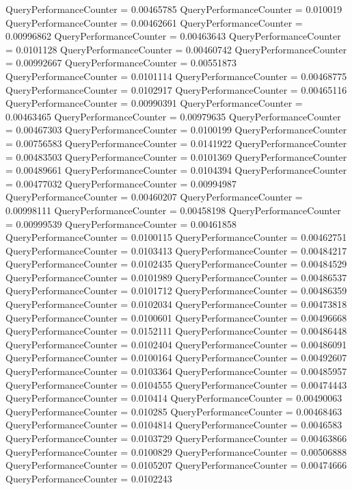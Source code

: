 \documentclass[9pt]{article}
\theoremstyle{plain}
\theoremstyle{definition}
\theoremstyle{remark}
\numberwithin{equation}{section}
\begin{document}
QueryPerformanceCounter  =  0.00465785
QueryPerformanceCounter  =  0.010019
QueryPerformanceCounter  =  0.00462661
QueryPerformanceCounter  =  0.00996862
QueryPerformanceCounter  =  0.00463643
QueryPerformanceCounter  =  0.0101128
QueryPerformanceCounter  =  0.00460742
QueryPerformanceCounter  =  0.00992667
QueryPerformanceCounter  =  0.00551873
QueryPerformanceCounter  =  0.0101114
QueryPerformanceCounter  =  0.00468775
QueryPerformanceCounter  =  0.0102917
QueryPerformanceCounter  =  0.00465116
QueryPerformanceCounter  =  0.00990391
QueryPerformanceCounter  =  0.00463465
QueryPerformanceCounter  =  0.00979635
QueryPerformanceCounter  =  0.00467303
QueryPerformanceCounter  =  0.0100199
QueryPerformanceCounter  =  0.00756583
QueryPerformanceCounter  =  0.0141922
QueryPerformanceCounter  =  0.00483503
QueryPerformanceCounter  =  0.0101369
QueryPerformanceCounter  =  0.00489661
QueryPerformanceCounter  =  0.0104394
QueryPerformanceCounter  =  0.00477032
QueryPerformanceCounter  =  0.00994987
QueryPerformanceCounter  =  0.00460207
QueryPerformanceCounter  =  0.00998111
QueryPerformanceCounter  =  0.00458198
QueryPerformanceCounter  =  0.00999539
QueryPerformanceCounter  =  0.00461858
QueryPerformanceCounter  =  0.0100115
QueryPerformanceCounter  =  0.00462751
QueryPerformanceCounter  =  0.0103413
QueryPerformanceCounter  =  0.00484217
QueryPerformanceCounter  =  0.0102435
QueryPerformanceCounter  =  0.00484529
QueryPerformanceCounter  =  0.0101989
QueryPerformanceCounter  =  0.00486537
QueryPerformanceCounter  =  0.0101712
QueryPerformanceCounter  =  0.00486359
QueryPerformanceCounter  =  0.0102034
QueryPerformanceCounter  =  0.00473818
QueryPerformanceCounter  =  0.0100601
QueryPerformanceCounter  =  0.00496668
QueryPerformanceCounter  =  0.0152111
QueryPerformanceCounter  =  0.00486448
QueryPerformanceCounter  =  0.0102404
QueryPerformanceCounter  =  0.00486091
QueryPerformanceCounter  =  0.0100164
QueryPerformanceCounter  =  0.00492607
QueryPerformanceCounter  =  0.0103364
QueryPerformanceCounter  =  0.00485957
QueryPerformanceCounter  =  0.0104555
QueryPerformanceCounter  =  0.00474443
QueryPerformanceCounter  =  0.010414
QueryPerformanceCounter  =  0.00490063
QueryPerformanceCounter  =  0.010285
QueryPerformanceCounter  =  0.00468463
QueryPerformanceCounter  =  0.0104814
QueryPerformanceCounter  =  0.0046583
QueryPerformanceCounter  =  0.0103729
QueryPerformanceCounter  =  0.00463866
QueryPerformanceCounter  =  0.0100829
QueryPerformanceCounter  =  0.00506888
QueryPerformanceCounter  =  0.0105207
QueryPerformanceCounter  =  0.00474666
QueryPerformanceCounter  =  0.0102243
\end{document}
